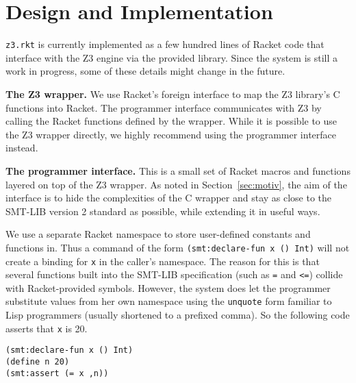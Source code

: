 \section{Design and Implementation}

\texttt{z3.rkt} is currently implemented as a few hundred lines of Racket code
that interface with the Z3 engine via the provided library. Since the system is
still a work in progress, some of these details might change in the future.

\textbf{The Z3 wrapper.} We use Racket's foreign interface \cite{racket/foreign}
to map the Z3 library's C functions into Racket. The programmer interface
communicates with Z3 by calling the Racket functions defined by the
wrapper. While it is possible to use the Z3 wrapper directly, we highly
recommend using the programmer interface instead.

\textbf{The programmer interface.} This is a small set of Racket macros and
functions layered on top of the Z3 wrapper. As noted in Section~\ref{sec:motiv},
the aim of the interface is to hide the complexities of the C wrapper and stay
as close to the SMT-LIB version 2 standard \cite{smtlib2:10} as possible, while
extending it in useful ways.

We use a separate Racket namespace to store user-defined constants and functions
in. Thus a command of the form \texttt{(smt:declare-fun x () Int)} will not
create a binding for \texttt{x} in the caller's namespace. The reason for this
is that several functions built into the SMT-LIB specification (such as
\texttt{=} and \texttt{<=}) collide with Racket-provided symbols. However, the
system does let the programmer substitute values from her own namespace using
the \texttt{unquote} form familiar to Lisp programmers (usually shortened to a
prefixed comma). So the following code asserts that \texttt{x} is 20.

\begin{verbatim}
(smt:declare-fun x () Int)
(define n 20)
(smt:assert (= x ,n))
\end{verbatim} 
